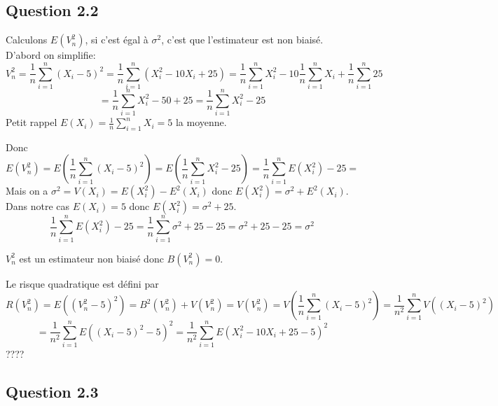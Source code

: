 \documentclass[]{book}
\theoremstyle{definition}
\begin{document}
\subsection*{Question 2.2}
Calculons $E(V_n^2)$, si c'est \'egal \`a $\sigma^2$, c'est que l'estimateur est non biais\'e.
D'abord on simplifie:
$$
V_n^2 = \frac{1}{n}\sum_{i=1}^{n}{(X_i -5)^2} = \frac{1}{n}\sum_{i=1}^{n}{(X_i^2 -10X_i + 25)} = \frac{1}{n}\sum_{i=1}^{n}{X_i^2} -10\frac{1}{n}\sum_{i=1}^{n}{X_i} + \frac{1}{n}\sum_{i=1}^{n}{25}
$$
$$
= \frac{1}{n}\sum_{i=1}^{n}{X_i^2} -50 + 25 = \frac{1}{n}\sum_{i=1}^{n}{X_i^2} -25
$$
Petit rappel $E(X_i) = \frac{1}{n}\sum_{i=1}^{n}{X_i} = 5$ la moyenne.

Donc
$$
E(V_n^2) = E\left(\frac{1}{n}\sum_{i=1}^{n}{(X_i -5)^2}\right) =  E\left(\frac{1}{n}\sum_{i=1}^{n}{X_i^2} -25\right) = \frac{1}{n} \sum_{i=1}^{n}{E(X_i^2)} -25 = 
$$
Mais on a $\sigma^2 = V(X_i) = E(X_i^2) - E^2(X_i) $ donc $E(X_i^2) = \sigma^2 + E^2(X_i)$. Dans notre cas $E(X_i) = 5$ donc $E(X_i^2) = \sigma^2 + 25$.
$$
\frac{1}{n} \sum_{i=1}^{n}{E(X_i^2)} -25 = \frac{1}{n} \sum_{i=1}^{n}{\sigma^2 + 25} -25 = \sigma^2 + 25-25 = \sigma^2  
$$

$V_n^2$ est un estimateur non biais\'e donc $B(V_n^2) = 0$.


Le risque quadratique est d\'efini par
$$
R(V_n^2) = E((V_n^2 - 5)^2) = B^2(V_n^2) + V(V_n^2) = V(V_n^2) = V \left( \frac{1}{n}\sum_{i=1}^{n}{(X_i -5)^2} \right) = \frac{1}{n^2} \sum_{i=1}^{n}{V((X_i -5)^2)}
$$
$$
= \frac{1}{n^2} \sum_{i=1}^{n}{E((X_i -5)^2-5)^2} = \frac{1}{n^2} \sum_{i=1}^{n}{E(X_i^2 - 10 X_i +25 -5)^2}
$$
????

\subsection*{Question 2.3}
\end{document}
